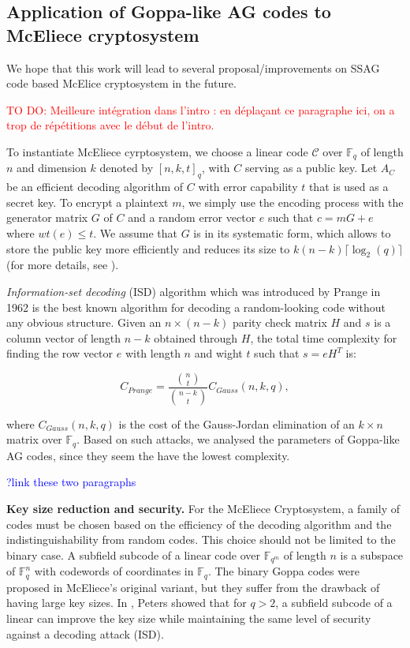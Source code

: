 \documentclass[a4paper]{amsart}
\theoremstyle{definition}
\theoremstyle{remark}
\newcommand{\calC}{\mathcal{C}}
\newcommand\TODO[1]{\textcolor{red}{TO DO: #1}}
\newcommand\sabira[1]{\textcolor{blue}{#1}}
\begin{document}
\subsection*{Application of Goppa-like AG codes to McEliece cryptosystem}

We hope that this work will lead to several proposal/improvements on SSAG code based McElice cryptosystem in the future. 

\TODO{Meilleure intégration dans l'intro : en déplaçant ce paragraphe ici, on a trop de répétitions avec le début de l'intro.}


To instantiate McEliece cyrptosystem, we choose a linear code $\calC$ over $\mathbb{F}_q$ of length $n$ and dimension $k$ denoted by $[n,k,t]_q$, with $C$ serving as a public key. Let $A_C$ be an efficient decoding algorithm of $C$ with error capability $t$ that is used as a secret key. To encrypt a plaintext $m$, we simply use the encoding process with the generator matrix $G$ of $C$ and a random error vector $e$ such that $c=mG+e$ where $wt(e) \leq t$. We assume that $G$ is in its systematic form, which allows to store the public key more efficiently and reduces its size to $k(n-k)\lceil \log_2(q) \rceil$ (for more details, see \cite{overbeck2009code}).

\textit{Information-set decoding} (ISD) algorithm which was introduced by Prange \cite{prange} in 1962 is the best known algorithm for decoding a random-looking code without any obvious structure. Given an $n\times (n-k)$ parity check matrix $H$ and $s$ is a column vector of length $n-k$ obtained through $H$, the total time complexity for finding the row vector $e$ with length $n$ and wight $t$ such that $s=eH^{T}$ is:

\[ C_{Prange}= \frac{\binom{n}{t}}{\binom{n-k}{t}}C_{Gauss}(n,k,q),\]

where $C_{Gauss}(n,k,q)$ is the cost of the Gauss-Jordan elimination of an $k\times n$ matrix over $\mathbb{F}_q$. Based on such attacks, we analysed the parameters of Goppa-like AG codes, since they seem the have the lowest complexity.
 
\sabira{?link these two paragraphs} 

\textbf{Key size reduction and security.} For the McEliece Cryptosystem, a family of codes must be chosen based on the efficiency of the decoding algorithm and the indistinguishability from random codes. This choice should not be limited to the binary case. A subfield subcode of a linear code over $\mathbb{F}_{q^m}$ of length $n$ is a subspace of $\mathbb{F}_{q}^n$ with codewords of coordinates in $\mathbb{F}_q$. The binary Goppa codes were proposed in McEliece's original variant, but they suffer from the drawback of having large key sizes. In \cite{petersIsd}, Peters showed that for $q > 2$, a subfield subcode of a linear can improve the key size while maintaining the same level of security against a decoding attack (ISD). 
\end{document}
